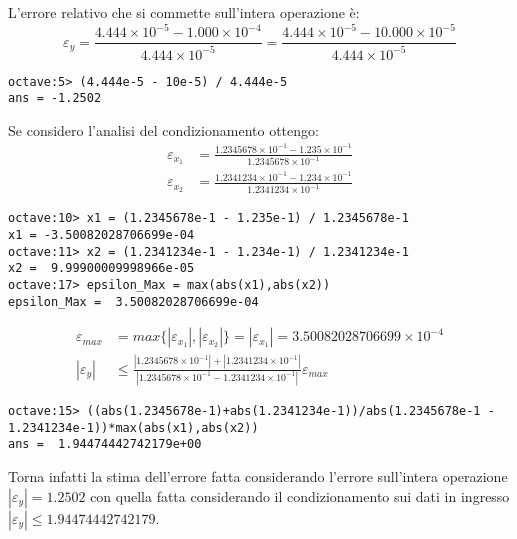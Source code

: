 L'errore relativo che si commette sull'intera operazione \`e:
\begin{displaymath}
	\varepsilon_{y} = \frac{4.444 \times 10^{-5} - 1.000 \times 10^{-4}}{4.444 \times 10^{-5}} = 
		 \frac{4.444 \times 10^{-5} - 10.000 \times 10^{-5}}{4.444 \times 10^{-5}} 
\end{displaymath}
\begin{lstlisting}
octave:5> (4.444e-5 - 10e-5) / 4.444e-5
ans = -1.2502
\end{lstlisting}
Se considero l'analisi del condizionamento ottengo:
\begin{displaymath}
\begin{split}
	\varepsilon_{x_{1}} & = \frac{1.2345678 \times 10^{-1} - 1.235 \times 10^{-1}}
			{1.2345678 \times 10^{-1}} \\
	\varepsilon_{x_{2}} & = \frac{1.2341234 \times 10^{-1} - 1.234 \times 10^{-1}}
			{1.2341234 \times 10^{-1}}
\end{split}
\end{displaymath}
\begin{lstlisting}
octave:10> x1 = (1.2345678e-1 - 1.235e-1) / 1.2345678e-1
x1 = -3.50082028706699e-04
octave:11> x2 = (1.2341234e-1 - 1.234e-1) / 1.2341234e-1
x2 =  9.99900009998966e-05
octave:17> epsilon_Max = max(abs(x1),abs(x2))
epsilon_Max =  3.50082028706699e-04
\end{lstlisting}
\begin{displaymath}
\begin{split}
	\varepsilon_{max} & = max \lbrace |\varepsilon_{x_{1}}|, |\varepsilon_{x_{2}}| \rbrace 
		= |\varepsilon_{x_{1}}| = 3.50082028706699 \times 10^{-4}\\
	|\varepsilon_{y}| & \leq \frac{|1.2345678 \times 10^{-1}| + |1.2341234 \times 10^{-1}|}
		{|1.2345678 \times 10^{-1} - 1.2341234 \times 10^{-1}|}\varepsilon_{max}
\end{split}
\end{displaymath}
\begin{lstlisting}
octave:15> ((abs(1.2345678e-1)+abs(1.2341234e-1))/abs(1.2345678e-1 - 1.2341234e-1))*max(abs(x1),abs(x2))
ans =  1.94474442742179e+00
\end{lstlisting}
Torna infatti la stima dell'errore fatta considerando l'errore sull'intera 
operazione $|\varepsilon_{y}| = 1.2502$ con quella fatta considerando il 
condizionamento sui dati in ingresso$|\varepsilon_{y}| \leq 1.94474442742179$.

